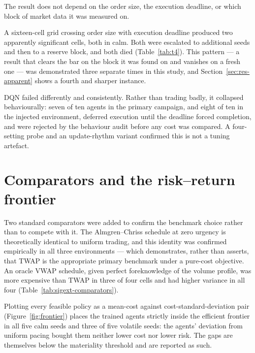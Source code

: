 The result does not depend on the order size, the execution deadline, or which block of
market data it was measured on.

A sixteen-cell grid crossing order size with execution deadline produced two apparently
significant cells, both in calm. Both were escalated to additional seeds and then to a
reserve block, and both died (Table~\ref{tab:t4}). This pattern --- a result that clears the
bar on the block it was found on and vanishes on a fresh one --- was demonstrated three
separate times in this study, and Section~\ref{sec:res-apparent} shows a fourth and sharper
instance.

DQN failed differently and consistently. Rather than trading badly, it collapsed
behaviourally: seven of ten agents in the primary campaign, and eight of ten in the injected
environment, deferred execution until the deadline forced completion, and were rejected by
the behaviour audit before any cost was compared. A four-setting probe and an
update-rhythm variant confirmed this is not a tuning artefact.

\section{Comparators and the risk--return frontier}\label{sec:res-comparators}

Two standard comparators were added to confirm the benchmark choice rather than to compete
with it. The Almgren--Chriss schedule at zero urgency is theoretically identical to uniform
trading, and this identity was confirmed empirically in all three environments --- which
demonstrates, rather than asserts, that TWAP is the appropriate primary benchmark under a
pure-cost objective. An oracle VWAP schedule, given perfect foreknowledge of the volume
profile, was more expensive than TWAP in three of four cells and had higher variance in all
four (Table~\ref{tab:sigext-comparators}).

Plotting every feasible policy as a mean-cost against cost-standard-deviation pair
(Figure~\ref{fig:frontier}) places the trained agents strictly inside the efficient frontier
in all five calm seeds and three of five volatile seeds: the agents' deviation from uniform
pacing bought them neither lower cost nor lower risk. The gaps are themselves below the
materiality threshold and are reported as such.

